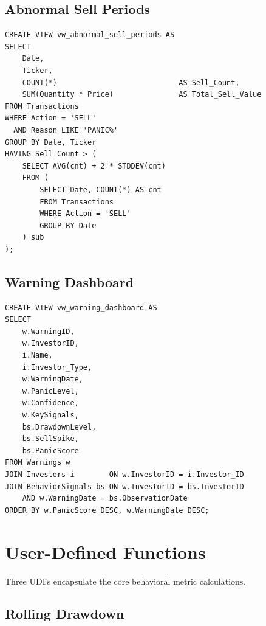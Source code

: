 \subsection{Abnormal Sell Periods}

\begin{lstlisting}[style=sqlstyle, caption={View: vw\_abnormal\_sell\_periods}]
CREATE VIEW vw_abnormal_sell_periods AS
SELECT 
    Date,
    Ticker,
    COUNT(*)                            AS Sell_Count,
    SUM(Quantity * Price)               AS Total_Sell_Value
FROM Transactions
WHERE Action = 'SELL'
  AND Reason LIKE 'PANIC%'
GROUP BY Date, Ticker
HAVING Sell_Count > (
    SELECT AVG(cnt) + 2 * STDDEV(cnt)
    FROM (
        SELECT Date, COUNT(*) AS cnt
        FROM Transactions
        WHERE Action = 'SELL'
        GROUP BY Date
    ) sub
);
\end{lstlisting}

\subsection{Warning Dashboard}

\begin{lstlisting}[style=sqlstyle, caption={View: vw\_warning\_dashboard}]
CREATE VIEW vw_warning_dashboard AS
SELECT 
    w.WarningID,
    w.InvestorID,
    i.Name,
    i.Investor_Type,
    w.WarningDate,
    w.PanicLevel,
    w.Confidence,
    w.KeySignals,
    bs.DrawdownLevel,
    bs.SellSpike,
    bs.PanicScore
FROM Warnings w
JOIN Investors i        ON w.InvestorID = i.Investor_ID
JOIN BehaviorSignals bs ON w.InvestorID = bs.InvestorID
    AND w.WarningDate = bs.ObservationDate
ORDER BY w.PanicScore DESC, w.WarningDate DESC;
\end{lstlisting}

\section{User-Defined Functions}

Three UDFs encapsulate the core behavioral metric calculations.

\subsection{Rolling Drawdown}

